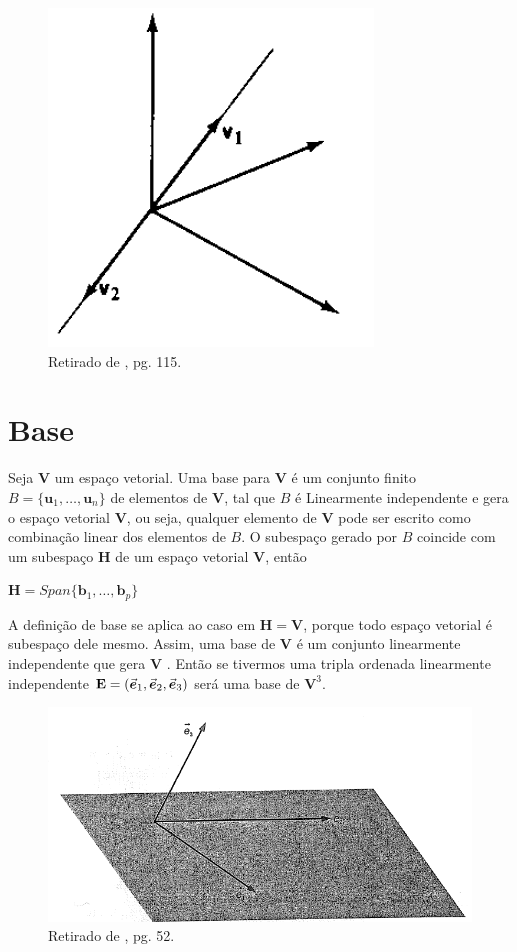 \begin{figure}[H]
	\centering
	\includegraphics[scale=0.90]{cb_exemplo10.png}
	\caption{Retirado de \cite{boldrini1980}, pg. 115.}
\end{figure}

\section{Base}
Seja $\mathbf{V}$ um espaço vetorial. Uma base para $\mathbf{V}$ é um conjunto finito  $B = \{\mathbf{u}_1, \ldots, \mathbf{u}_n\}$ de elementos de $\mathbf{V}$, tal que $B$ é Linearmente independente e gera o espaço vetorial $\mathbf{V}$, ou seja, qualquer elemento de $\mathbf{V}$ pode ser escrito como combinação linear dos elementos de $B$. O subespaço gerado por $B$ coincide com um subespaço $\mathbf{H}$ de um espaço vetorial $\mathbf{V}$, então

\centerline{$\mathbf{H} = Span\{\mathbf{b}_1, \ldots, \mathbf{b}_p\}$}

A definição de base se aplica ao caso em $\mathbf{H} = \mathbf{V}$, porque todo espaço vetorial é subespaço dele mesmo. Assim, uma base de $\mathbf{V}$ é um conjunto linearmente independente que gera $\mathbf{V}$ \cite{lay1999}. Então se tivermos uma tripla ordenada linearmente independente $\mathbf{E} = (\va*{e}_1, \va*{e}_2, \va*{e}_3)$ será uma base de $\mathbf{V}^3$.

\begin{figure}[H]
	\centering
	\includegraphics[scale=0.90]{b_v3.png}
	\caption{Retirado de \cite{camargo2005}, pg. 52.}
\end{figure}

